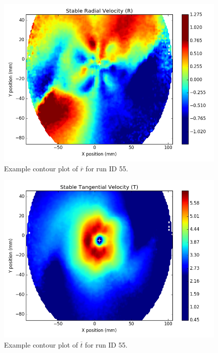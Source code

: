 {\begin{figure}[H]
	\centering
	\includegraphics[width=5in]{figs/example_vortex_figs/example_R_contour}
\caption{Example contour plot of $\overline{r}$ for run ID 55.}
\label{fig:examp_R}
\end{figure}

\begin{figure}[H]
	\centering
	\includegraphics[width=5in]{figs/example_vortex_figs/example_T_contour}
\caption{Example contour plot of $\overline{t}$ for run ID 55.}
\label{fig:examp_T}
\end{figure}

}
